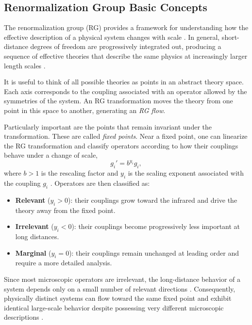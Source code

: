 \documentclass[a4paper, 11pt]{article}
\begin{document}
\subsection{Renormalization Group Basic Concepts}
\label{sec:RG_intro}

The renormalization group (RG) provides a framework for understanding how the effective description of a physical system changes with scale \cite{Goldenfeld, Cardy}. In general, short-distance degrees of freedom are progressively integrated out, producing a sequence of effective theories that describe the same physics at increasingly larger length scales \cite{TongSFT}.

It is useful to think of all possible theories as points in an abstract theory space. Each axis corresponds to the coupling associated with an operator allowed by the symmetries of the system. An RG transformation moves the theory from one point in this space to another, generating an \textit{RG flow}.

Particularly important are the points that remain invariant under the transformation. These are called \textit{fixed points}. Near a fixed point, one can linearize the RG transformation and classify operators according to how their couplings behave under a change of scale,
\begin{equation*}
g_i' = b^{y_i} g_i ,
\end{equation*}
where $b>1$ is the rescaling factor and $y_i$ is the scaling exponent associated with the coupling $g_i$ \cite{Goldenfeld,Cardy}. Operators are then classified as:
\begin{itemize}
\item \textbf{Relevant} ($y_i>0$): their couplings grow toward the infrared and drive the theory away from the fixed point.
\item \textbf{Irrelevant} ($y_i<0$): their couplings become progressively less important at long distances.
\item \textbf{Marginal} ($y_i=0$): their couplings remain unchanged at leading order and require a more detailed analysis.
\end{itemize}

Since most microscopic operators are irrelevant, the long-distance behavior of a system depends only on a small number of relevant directions \cite{TongSFT}. Consequently, physically distinct systems can flow toward the same fixed point and exhibit identical large-scale behavior despite possessing very different microscopic descriptions \cite{Goldenfeld, Cardy}.
\end{document}
